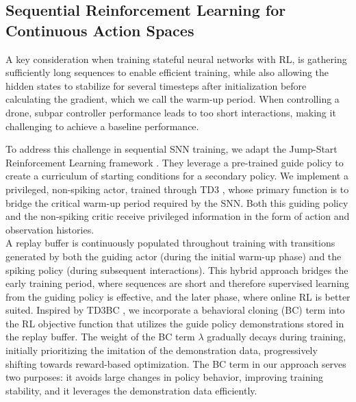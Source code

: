 \subsection{Sequential Reinforcement Learning for Continuous Action Spaces}\label{seq_snn}
A key consideration when training stateful neural networks with RL, is gathering sufficiently long sequences to enable efficient training, while also allowing the hidden states to stabilize for several timesteps after initialization before calculating the gradient, which we call the warm-up period. When controlling a drone, subpar controller performance leads to too short interactions, making it challenging to achieve a baseline performance.

To address this challenge in sequential SNN training, we adapt the Jump-Start Reinforcement Learning framework \cite{Uchendu2022}. They leverage a pre-trained guide policy to create a curriculum of starting conditions for a secondary policy. We implement a privileged, non-spiking actor, trained through TD3 \cite{fujimoto2018addressing}, whose primary function is to bridge the critical warm-up period required by the SNN. Both this guiding policy and the non-spiking critic receive privileged information in the form of action and observation histories. \\


A replay buffer is continuously populated throughout training with transitions generated by both the guiding actor (during the initial warm-up phase) and the spiking policy (during subsequent interactions). This hybrid approach bridges the early training period, where sequences are short and therefore supervised learning from the guiding policy is effective, and the later phase, where online RL is better suited. Inspired by TD3BC \cite{FujimotoMinimal}, we incorporate a behavioral cloning (BC) term into the RL objective function that utilizes the guide policy demonstrations stored in the replay buffer. The weight of the BC term \( \lambda \) gradually decays during training, initially prioritizing the imitation of the demonstration data, progressively shifting towards reward-based optimization. The BC term in our approach serves two purposes: it avoids large changes in policy behavior, improving training stability, and it leverages the demonstration data efficiently.

